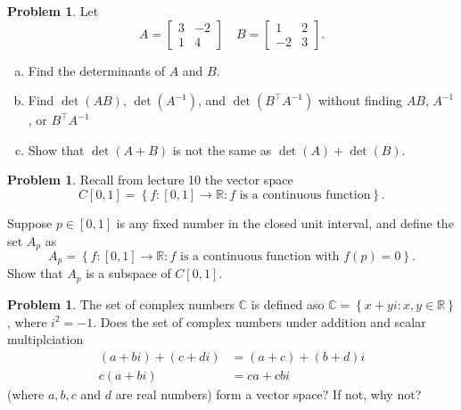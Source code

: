 \documentclass[10pt]{article}
\theoremstyle{definition}
\newtheorem{problem}[theorem]{Problem}
\newcommand{\1}[1]{\textbf{1}_{\left[#1\right]}} %
\def\R{\mathbb{R}} %
\begin{document}
\begin{problem}
  Let
  \begin{equation*}
    A =
    \begin{bmatrix}
      3&-2\\
      1&4
    \end{bmatrix}
    \quad
    B =
    \begin{bmatrix}
      1&2\\
      -2&3
    \end{bmatrix}.
  \end{equation*}
  \begin{enumerate}[(a)]
    \item Find the determinants of  $A$ and $B$.
    \item Find $\det(AB)$, $\det(A^{-1})$, and $\det(B^{\top}A^{-1})$ without
    finding $AB$, $A^{-1}$, or $B^{\top}A^{-1}$
    \item Show that $\det(A+B)$ is not the same as $\det(A)+\det(B)$.
  \end{enumerate}
\end{problem}

\begin{problem}
  Recall from lecture 10 the vector space
  \begin{equation*}
    C[0,1] = \left\{f:[0,1]\to \R: f\text{ is a continuous function}\right\}.
  \end{equation*}

  Suppose $p\in [0,1]$ is any fixed number in the closed unit interval, and
  define the set $A_{p}$ as
  \begin{equation*}
    A_{p} = \left\{f:[0,1]\to \R: f\text{ is a continuous function with }f(p)=0\right\}.
  \end{equation*}
  Show that $A_{p}$ is a subspace of $C[0,1]$.
\end{problem}

\begin{problem}
  The set of complex numbers $\mathbb{C}$ is defined aso
  $\mathbb{C}=\left\{x+yi: x,y\in \R\right\}$, where $i^{2}=-1$. Does the set of
  complex numbers under addition and scalar multiplciation
  \begin{align*}
    (a+bi)+(c+di)  &= (a+c)+(b+d)i\\
    c(a+bi)&=ca+cbi
  \end{align*}
  (where $a,b,c$ and $d$ are real numbers) form a vector space? If not, why not?
\end{problem}
\end{document}

